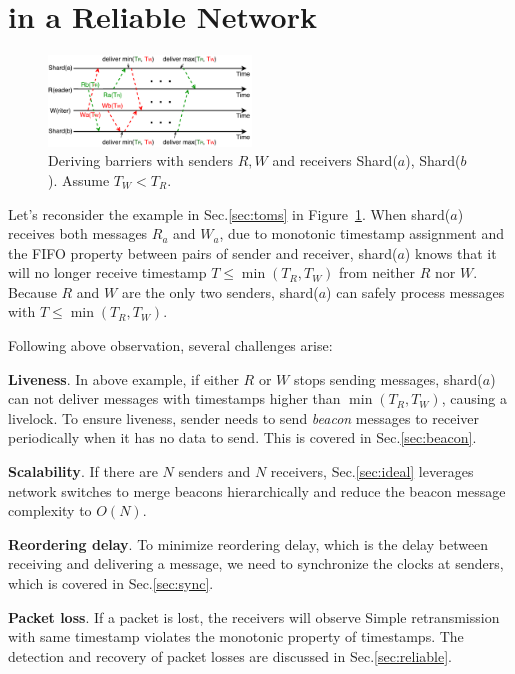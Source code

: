 \section{\sys in a Reliable Network}

\begin{figure}[t]
\centering
\includegraphics[width=0.48\textwidth]{images/derive_barriers.pdf}
\caption{Deriving barriers with senders $R, W$ and receivers Shard($a$), Shard($b$). Assume $T_W < T_R$.}
\label{fig:barrier}
\vspace{-1em}
\end{figure}

Let's reconsider the example in Sec.\ref{sec:toms} in Figure~\ref{fig:barrier}.
When shard($a$) receives both messages $R_a$ and $W_a$, due to monotonic timestamp assignment and the FIFO property between pairs of sender and receiver, shard($a$) knows that it will no longer receive timestamp $T \leq \min(T_R, T_W)$ from neither $R$ nor $W$.
Because $R$ and $W$ are the only two senders, shard($a$) can safely process messages with $T \leq \min(T_R, T_W)$.

Following above observation, several challenges arise:

\textbf{Liveness}.
In above example, if either $R$ or $W$ stops sending messages, shard($a$) can not deliver messages with timestamps higher than $\min(T_R,T_W)$, causing a livelock.
To ensure liveness, sender needs to send \textit{beacon} messages to receiver  periodically when it has no data to send.
This is covered in Sec.\ref{sec:beacon}.

\textbf{Scalability}.
If there are $N$ senders and $N$ receivers, 
Sec.\ref{sec:ideal} leverages network switches to merge beacons hierarchically and reduce the beacon message complexity to $O(N)$.

\textbf{Reordering delay}. To minimize reordering delay, which is the delay between receiving and delivering a message, we need to synchronize the clocks at senders, which is covered in Sec.\ref{sec:sync}.

\textbf{Packet loss}.
If a packet is lost, the receivers will observe 
Simple retransmission with same timestamp violates the monotonic property of timestamps.
The detection and recovery of packet losses are discussed in Sec.\ref{sec:reliable}.

